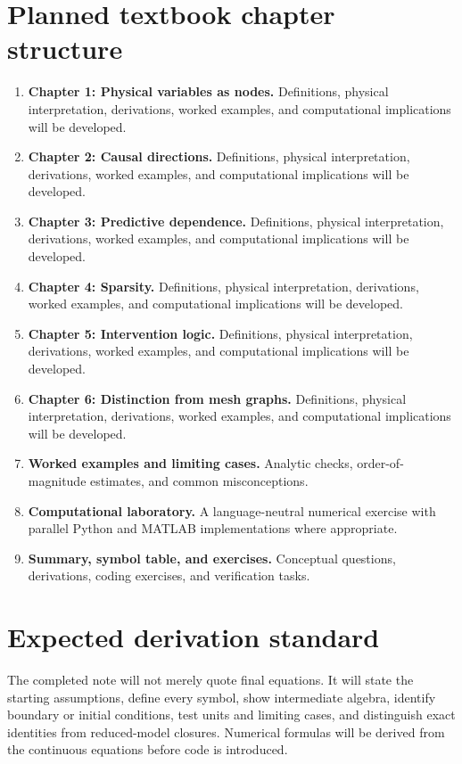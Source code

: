 \documentclass[11pt]{article}
\begin{document}
\section{Planned textbook chapter structure}
\begin{enumerate}[leftmargin=1.8em]
\item \textbf{Chapter 1: Physical variables as nodes.} Definitions, physical interpretation, derivations, worked examples, and computational implications will be developed.
\item \textbf{Chapter 2: Causal directions.} Definitions, physical interpretation, derivations, worked examples, and computational implications will be developed.
\item \textbf{Chapter 3: Predictive dependence.} Definitions, physical interpretation, derivations, worked examples, and computational implications will be developed.
\item \textbf{Chapter 4: Sparsity.} Definitions, physical interpretation, derivations, worked examples, and computational implications will be developed.
\item \textbf{Chapter 5: Intervention logic.} Definitions, physical interpretation, derivations, worked examples, and computational implications will be developed.
\item \textbf{Chapter 6: Distinction from mesh graphs.} Definitions, physical interpretation, derivations, worked examples, and computational implications will be developed.
\item \textbf{Worked examples and limiting cases.} Analytic checks, order-of-magnitude estimates, and common misconceptions.
\item \textbf{Computational laboratory.} A language-neutral numerical exercise with parallel Python and MATLAB implementations where appropriate.
\item \textbf{Summary, symbol table, and exercises.} Conceptual questions, derivations, coding exercises, and verification tasks.
\end{enumerate}

\section{Expected derivation standard}
The completed note will not merely quote final equations. It will state the starting assumptions, define every symbol, show intermediate algebra, identify boundary or initial conditions, test units and limiting cases, and distinguish exact identities from reduced-model closures. Numerical formulas will be derived from the continuous equations before code is introduced.
\end{document}
